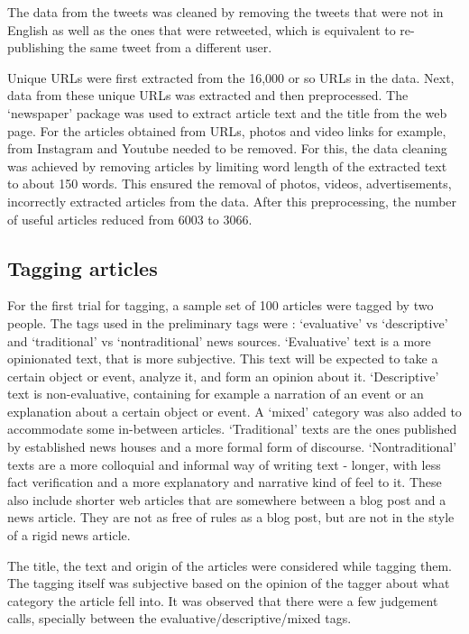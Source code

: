 \documentclass[11pt]{article}
\begin{document}
The data from the tweets was cleaned by removing the tweets that were not in English as well as the ones that were retweeted, which is equivalent to re-publishing the same tweet from a different user. 

Unique URLs were first extracted from the 16,000 or so URLs in the data. Next, data from these unique URLs was extracted and then preprocessed. The ‘newspaper’ package was used to extract article text and the title from the web page. For the articles obtained from URLs, photos and video links for example, from Instagram and Youtube needed to be removed. For this, the data cleaning was achieved by removing articles by limiting word length of the extracted text to about 150 words. This ensured the removal of photos, videos, advertisements, incorrectly extracted articles from the data.  After this preprocessing, the number of useful articles reduced from 6003 to 3066.

\subsection {Tagging articles}

For the first trial for tagging, a sample set of 100 articles were tagged by two people. The tags used in the preliminary tags were : ‘evaluative’ vs ‘descriptive’ and ‘traditional’ vs ‘nontraditional’ news sources. ‘Evaluative’ text is a more opinionated text, that is more subjective. This text will be expected to take a certain object or event, analyze it,  and form an opinion about it. ‘Descriptive’ text is non-evaluative, containing for example a narration of an event or an explanation about a certain object or event. A ‘mixed’ category was also added to accommodate some in-between articles. ‘Traditional’ texts are the ones published by established news houses and a more formal form of discourse. ‘Nontraditional’ texts are a more colloquial and informal way of writing text - longer, with less fact verification and a more explanatory and narrative kind of feel to it. These also include shorter web articles that are somewhere between a blog post and a news article. They are not as free of rules as a blog post, but are not in the style of a rigid news article.

The title, the text and origin of the articles were considered while tagging them. The tagging itself was subjective based on the opinion of the tagger about what category the article fell into. It was observed that there were a few judgement calls, specially between the evaluative/descriptive/mixed tags.
\end{document}
